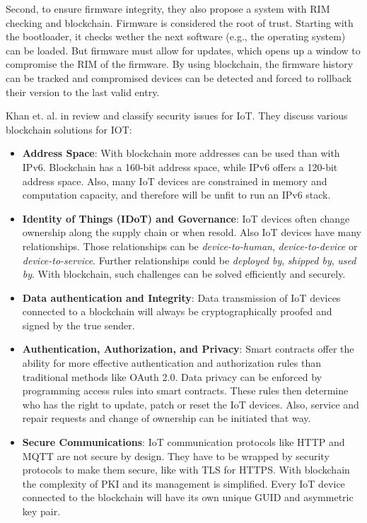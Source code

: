 Second, to ensure firmware integrity, they also propose a system with RIM checking and blockchain.
Firmware is considered the root of trust. Starting with the bootloader, it checks wether the next software (e.g., the operating system) can be loaded.
But firmware must allow for updates, which opens up a window to compromise the RIM of the firmware. By using blockchain, the firmware history can be tracked and compromised devices can be detected and forced to rollback their
version to the last valid entry.

Khan et. al. in \cite{Khan2018} review and classify security issues for IoT. They discuss various blockchain solutions for IOT:

\begin{itemize}
  \item {\textbf{Address Space}: With blockchain more addresses can be used than with IPv6. Blockchain has a 160-bit address space, while IPv6 offers a 120-bit address space.
  Also, many IoT devices are constrained in memory and computation capacity, and therefore will be unfit to run an IPv6 stack.}
  \item {\textbf{Identity of Things (IDoT) and Governance}: IoT devices often change ownership along the supply chain or when resold. Also IoT devices have many relationships. Those relationships can be \textit{device-to-human}, \textit{device-to-device} or \textit{device-to-service}. Further relationships could be \textit{deployed by}, \textit{shipped by}, \textit{used by}. With blockchain, such challenges can be solved efficiently and securely.}
  \item {\textbf{Data authentication and Integrity}: Data transmission of IoT devices connected to a blockchain will always be  cryptographically proofed and signed by the true sender.}
  \item {\textbf{Authentication, Authorization, and Privacy}: Smart contracts offer the ability for more effective authentication and authorization rules than traditional methods like OAuth 2.0. Data privacy can be enforced by programming access rules into smart contracts. These rules then determine who has the right to update, patch or reset the IoT devices. Also, service and repair requests and change of ownership can be initiated that way. }
  \item {\textbf{Secure Communications}: IoT communication protocols like HTTP and MQTT are not secure by design. They have to be wrapped by security protocols to make them secure, like with TLS for HTTPS.
  With blockchain the complexity of PKI and its management is simplified. Every IoT device connected to the blockchain will have its own unique GUID and asymmetric key pair. }
\end{itemize}


